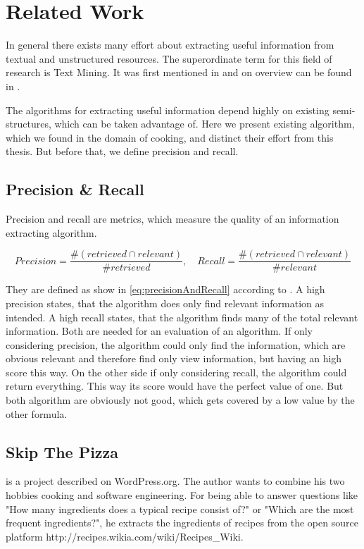 \documentclass[12pt, twoside]{report}
\begin{document}
\chapter{Related Work}
In general there exists many effort about extracting useful information from textual and unstructured resources. The superordinate term for this field of research is Text Mining. It was first mentioned in \parencite{KDT} and on overview can be found in \parencite{surveyOfTextMining}. 

The algorithms for extracting useful information depend highly on existing semi-structures, which can be taken advantage of. Here we present existing algorithm, which we found in the domain of cooking, and distinct their effort from this thesis. But before that, we define precision and recall.

\section{Precision \& Recall}
Precision and recall are metrics, which measure the quality of an information extracting algorithm.

\begin{equation} \label{eq:precisionAndRecall}
	Precision = \frac{\#(retrieved \cap relevant)}{\#retrieved}, \hspace{1em} Recall = \frac{\#(retrieved \cap relevant)}{\#relevant}
\end{equation}

They are defined as show in \cref{eq:precisionAndRecall} according to  \parencite{surveyOfTextMining}. A high precision states, that the algorithm does only find relevant information as intended. A high recall states, that the algorithm finds many of the total relevant information. Both are needed for an evaluation of an algorithm. If only considering precision, the algorithm could only find the information, which are obvious relevant and therefore find only view information, but having an high score this way. On the other side if only considering recall, the algorithm could return everything. This way its score would have the perfect value of one. But both algorithm are obviously not good, which gets covered by a low value by the other formula.


\section{Skip The Pizza}
\parencite{REgutGenug} is a project described on WordPress.org. The author wants to combine his two hobbies cooking and software engineering. For being able to answer questions like "How many ingredients does a typical recipe consist of?" or "Which are the most frequent ingredients?", he extracts the ingredients of recipes from the open source platform http://recipes.wikia.com/wiki/Recipes\_Wiki.
\end{document}
